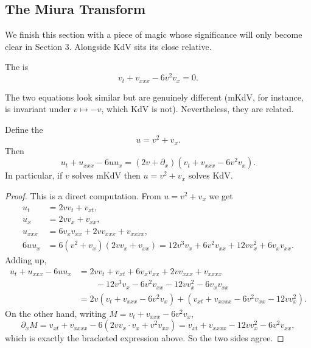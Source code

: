 \documentclass[a4paper]{scrartcl}
\begin{document}
\subsection{The Miura Transform}

We finish this section with a piece of magic whose significance will only become clear in Section 3. Alongside KdV sits its close relative.

\begin{definition}[mKdV]
	The  is
	$$
	v_t + v_{xxx} - 6v^2v_x = 0.
	$$
\end{definition}

The two equations look similar but are genuinely different (mKdV, for instance, is invariant under $v\mapsto -v$, which KdV is not). Nevertheless, they are related.

\begin{proposition}
	Define the 
	$$
	u = v^2 + v_x.
	$$
	Then
	$$
	u_t + u_{xxx} - 6uu_x = \left(2v + \partial_x\right)\left(v_t + v_{xxx} - 6v^2v_x\right).
	$$
	In particular, if $v$ solves mKdV then $u = v^2 + v_x$ solves KdV.
\end{proposition}
\begin{proof}
	This is a direct computation. From $u = v^2+v_x$ we get
	\begin{align*}
		u_t &= 2vv_t + v_{xt},\\
		u_x &= 2vv_x + v_{xx},\\
		u_{xxx} &= 6v_xv_{xx} + 2vv_{xxx} + v_{xxxx},\\
		6uu_x &= 6(v^2+v_x)(2vv_x+v_{xx}) = 12v^3v_x + 6v^2v_{xx} + 12vv_x^2 + 6v_xv_{xx}.
	\end{align*}
	Adding up,
	\begin{align*}
		u_t + u_{xxx} - 6uu_x &= 2vv_t + v_{xt} + 6v_xv_{xx} + 2vv_{xxx} + v_{xxxx}\\
		&\qquad - 12v^3v_x - 6v^2v_{xx} - 12vv_x^2 - 6v_xv_{xx}\\
		&= 2v\left(v_t + v_{xxx} - 6v^2v_x\right) + \left(v_{xt} + v_{xxxx} - 6v^2v_{xx} - 12vv_x^2\right).
	\end{align*}
	On the other hand, writing $M = v_t + v_{xxx} - 6v^2v_x$,
	$$
	\partial_x M = v_{xt} + v_{xxxx} - 6\left(2vv_x\cdot v_x + v^2v_{xx}\right) = v_{xt} + v_{xxxx} - 12vv_x^2 - 6v^2v_{xx},
	$$
	which is exactly the bracketed expression above. So the two sides agree.
\end{proof}
\end{document}
